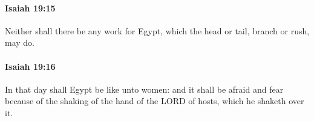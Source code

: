 		\paragraph{Isaiah 19:15} %
			\label{ISAIAH-19-15}

			Neither shall there be any work for Egypt, which the head or tail, branch or rush, may do.


		\paragraph{Isaiah 19:16} %
			\label{ISAIAH-19-16}

			In that day shall Egypt be like unto women: and it shall be afraid and fear because of the shaking of the hand of the LORD of hosts, which he shaketh over it.


